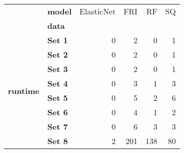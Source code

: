 \begin{tabular}{llrrrr}
\toprule
        & \textbf{model} &  ElasticNet &  FRI &   RF &  SQ \\
{} & \textbf{data} &             &      &      &     \\
\midrule
\multirow{8}{*}{\textbf{runtime}} & \textbf{Set 1} &           0 &    2 &    0 &   1 \\
        & \textbf{Set 2} &           0 &    2 &    0 &   1 \\
        & \textbf{Set 3} &           0 &    2 &    0 &   1 \\
        & \textbf{Set 4} &           0 &    3 &    1 &   3 \\
        & \textbf{Set 5} &           0 &    5 &    2 &   6 \\
        & \textbf{Set 6} &           0 &    4 &    1 &   2 \\
        & \textbf{Set 7} &           0 &    6 &    3 &   3 \\
        & \textbf{Set 8} &           2 &  201 &  138 &  80 \\
\bottomrule
\end{tabular}
